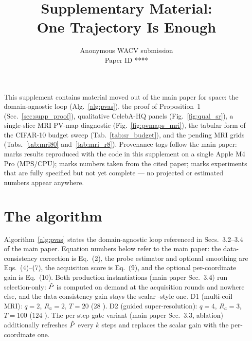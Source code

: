 \documentclass[10pt,twocolumn,letterpaper]{article}
\def\wacvPaperID{****} %
\begin{document}
\title{Supplementary Material:\\One Trajectory Is Enough}
\author{Anonymous WACV submission\\Paper ID \wacvPaperID}
\maketitle

\noindent This supplement contains material moved out of the main paper
for space: the domain-agnostic \pvas{} loop (Alg.~\ref{alg:pvas}), the
proof of Proposition~1 (Sec.~\ref{sec:supp_proof}),
qualitative CelebA-HQ panels (Fig.~\ref{fig:qual_sr}), a single-slice
MRI PV-map diagnostic (Fig.~\ref{fig:pvmaps_mri}), the tabular form of
the CIFAR-10 budget sweep (Tab.~\ref{tab:sr_budget}), and the pending
MRI grids (Tabs.~\ref{tab:mri80} and~\ref{tab:mri_r8}). Provenance tags
follow the main paper: \RLOCAL{} marks results reproduced with the code
in this supplement on a single Apple M4 Pro (MPS/CPU); \CITED{} marks
numbers taken from the cited paper; \PENDING{} marks experiments that
are fully specified but not yet complete --- no projected or estimated
numbers appear anywhere.

\section{The \pvas{} algorithm}\label{sec:supp_alg}

Algorithm~\ref{alg:pvas} states the domain-agnostic \pvas{} loop
referenced in Secs.~3.2--3.4 of the main paper. Equation numbers below
refer to the main paper: the data-consistency correction is Eq.~(2),
the probe estimator and optional smoothing are Eqs.~(4)--(7), the
acquisition score is Eq.~(9), and the optional per-coordinate gain is
Eq.~(10). Both production instantiations (main paper Sec.~3.4) run
selection-only: $\hat{P}$ is computed on demand at the acquisition rounds
and nowhere else, and the data-consistency gain stays the scalar
\pigdm-style one. D1 (multi-coil MRI): $q{=}2$, $R_a{=}2$, $T{=}20$
($28$ \nfe). D2 (guided super-resolution): $q{=}4$, $R_a{=}3$,
$T{=}100$ ($124$ \nfe). The per-step gate variant (main paper
Sec.~3.3, ablation) additionally refreshes $\hat{P}$ every $k$ steps and
replaces the scalar gain with the per-coordinate one.
\end{document}
